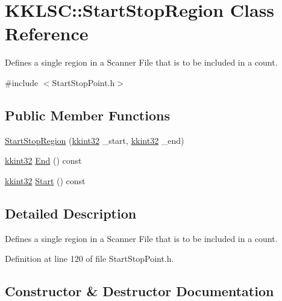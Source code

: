 \hypertarget{class_k_k_l_s_c_1_1_start_stop_region}{}\section{K\+K\+L\+SC\+:\+:Start\+Stop\+Region Class Reference}
\label{class_k_k_l_s_c_1_1_start_stop_region}


Defines a single region in a Scanner File that is to be included in a count.  




{\ttfamily \#include $<$Start\+Stop\+Point.\+h$>$}

\subsection*{Public Member Functions}
\begin{DoxyCompactItemize}
\item 
\hyperlink{class_k_k_l_s_c_1_1_start_stop_region_a78952ea60c9c8403ad3480367f44b175}{Start\+Stop\+Region} (\hyperlink{namespace_k_k_b_a8fa4952cc84fda1de4bec1fbdd8d5b1b}{kkint32} \+\_\+start, \hyperlink{namespace_k_k_b_a8fa4952cc84fda1de4bec1fbdd8d5b1b}{kkint32} \+\_\+end)
\item 
\hyperlink{namespace_k_k_b_a8fa4952cc84fda1de4bec1fbdd8d5b1b}{kkint32} \hyperlink{class_k_k_l_s_c_1_1_start_stop_region_a3769d948693d5a32fcbbbc25c3642dcf}{End} () const 
\item 
\hyperlink{namespace_k_k_b_a8fa4952cc84fda1de4bec1fbdd8d5b1b}{kkint32} \hyperlink{class_k_k_l_s_c_1_1_start_stop_region_af7c5792d0df1a2b7ad6ac202965b34a7}{Start} () const 
\end{DoxyCompactItemize}


\subsection{Detailed Description}
Defines a single region in a Scanner File that is to be included in a count. 

Definition at line 120 of file Start\+Stop\+Point.\+h.



\subsection{Constructor \& Destructor Documentation}
